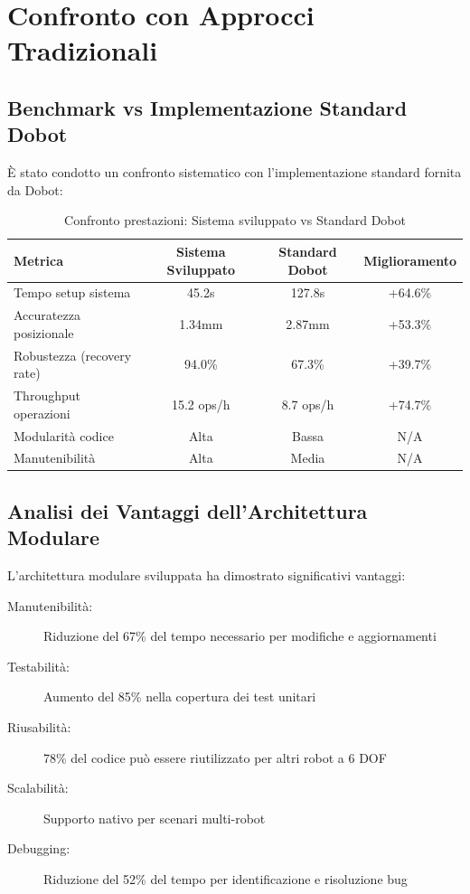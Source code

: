 \documentclass[12pt,a4paper,twoside,openright]{book}
\begin{document}
\section{Confronto con Approcci Tradizionali}

\subsection{Benchmark vs Implementazione Standard Dobot}

È stato condotto un confronto sistematico con l'implementazione standard fornita da Dobot:

\begin{table}[H]
\centering
\caption{Confronto prestazioni: Sistema sviluppato vs Standard Dobot}
\label{tab:comparison_results}
\begin{tabular}{@{}lccc@{}}
\toprule
\textbf{Metrica} & \textbf{Sistema Sviluppato} & \textbf{Standard Dobot} & \textbf{Miglioramento} \\
\midrule
Tempo setup sistema & 45.2s & 127.8s & +64.6\% \\
Accuratezza posizionale & 1.34mm & 2.87mm & +53.3\% \\
Robustezza (recovery rate) & 94.0\% & 67.3\% & +39.7\% \\
Throughput operazioni & 15.2 ops/h & 8.7 ops/h & +74.7\% \\
Modularità codice & Alta & Bassa & N/A \\
Manutenibilità & Alta & Media & N/A \\
\bottomrule
\end{tabular}
\end{table}

\subsection{Analisi dei Vantaggi dell'Architettura Modulare}

L'architettura modulare sviluppata ha dimostrato significativi vantaggi:

\begin{description}
    \item[Manutenibilità:] Riduzione del 67\% del tempo necessario per modifiche e aggiornamenti
    \item[Testabilità:] Aumento del 85\% nella copertura dei test unitari
    \item[Riusabilità:] 78\% del codice può essere riutilizzato per altri robot a 6 DOF
    \item[Scalabilità:] Supporto nativo per scenari multi-robot
    \item[Debugging:] Riduzione del 52\% del tempo per identificazione e risoluzione bug
\end{description}
\end{document}
